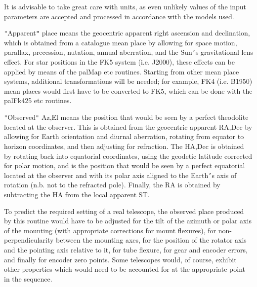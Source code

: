 \documentclass[twoside,11pt]{article}
\renewcommand{\_}{\texttt{\symbol{95}}}
\newcommand{\sstitem}{\item}
\newcommand{\sstitem}{\item}
\begin{document}
{{{         \sstitem
         It is advisable to take great care with units, as even
           unlikely values of the input parameters are accepted and
           processed in accordance with the models used.

         \sstitem
         {\tt "}Apparent{\tt "} place means the geocentric apparent right ascension
           and declination, which is obtained from a catalogue mean place
           by allowing for space motion, parallax, precession, nutation,
           annual aberration, and the Sun{\tt '}s gravitational lens effect.  For
           star positions in the FK5 system (i.e. J2000), these effects can
           be applied by means of the palMap etc routines.  Starting from
           other mean place systems, additional transformations will be
           needed;  for example, FK4 (i.e. B1950) mean places would first
           have to be converted to FK5, which can be done with the
           palFk425 etc routines.

         \sstitem
         {\tt "}Observed{\tt "} Az,El means the position that would be seen by a
           perfect theodolite located at the observer.  This is obtained
           from the geocentric apparent RA,Dec by allowing for Earth
           orientation and diurnal aberration, rotating from equator
           to horizon coordinates, and then adjusting for refraction.
           The HA,Dec is obtained by rotating back into equatorial
           coordinates, using the geodetic latitude corrected for polar
           motion, and is the position that would be seen by a perfect
           equatorial located at the observer and with its polar axis
           aligned to the Earth{\tt '}s axis of rotation (n.b. not to the
           refracted pole).  Finally, the RA is obtained by subtracting
           the HA from the local apparent ST.

         \sstitem
         To predict the required setting of a real telescope, the
           observed place produced by this routine would have to be
           adjusted for the tilt of the azimuth or polar axis of the
           mounting (with appropriate corrections for mount flexures),
           for non-perpendicularity between the mounting axes, for the
           position of the rotator axis and the pointing axis relative
           to it, for tube flexure, for gear and encoder errors, and
           finally for encoder zero points.  Some telescopes would, of
           course, exhibit other properties which would need to be
           accounted for at the appropriate point in the sequence.

}}}
\end{document}
